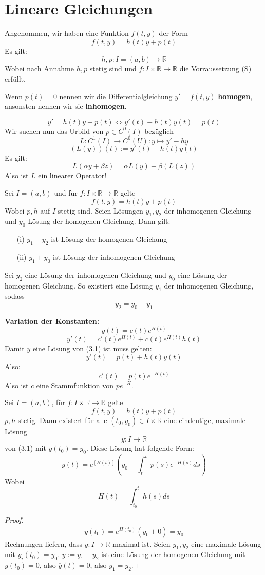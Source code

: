 \documentclass{report}
\newcommand*{\newpar}{\par\vspace{\baselineskip}\noindent}
\newcommand{\bR}{\mathbb{R}}
\begin{document}
\section{Lineare Gleichungen}
Angenommen, wir haben eine Funktion $f(t, y)$ der Form
\[f(t,y) = h(t)y + p(t)\]
Es gilt:
\[h, p : I = (a,b) \to \bR\]
Wobei nach Annahme $h, p$ stetig sind und $f : I \times \bR \to \bR$ die Vorraussetzung (S) erfüllt.
\newpar
Wenn $p(t) = 0$ nennen wir die Differentialgleichung $y' = f(t,y)$ \textbf{homogen}, ansonsten nennen wir sie \textbf{inhomogen}.
\newpar
\[y' = h(t)y + p(t) \Leftrightarrow y'(t) - h(t)y(t) = p(t)\]
Wir suchen nun das Urbild von $p \in C^0(I)$ bezüglich
\[L : C^1(I) \to C^0(U) : y \mapsto y' - hy\]
\[(L(y))(t) := y'(t) - h(t)y(t)\]
Es gilt:
\[L(\alpha y + \beta z) = \alpha L(y) + \beta(L(z))\]
Also ist $L$ ein linearer Operator!
\newpar
[...]
\clearpage
\begin{lemma}
	Sei $I = (a,b)$ und für $f : I \times \bR \to \bR$ gelte
	\[f(t,y) = h(t)y + p(t)\]
	Wobei $p, h$ auf $I$ stetig sind. Seien Lösungen $y_1, y_2$ der inhomogenen Gleichung und $y_0$ Lösung der homogenen Gleichung. Dann gilt:
	\begin{enumerate}
		\item[(i)] $y_1 - y_2$ ist Lösung der homogenen Gleichung
		\item[(ii)] $y_1 + y_0$ ist Lösung der inhomogenen Gleichung
	\end{enumerate}
\end{lemma}
\begin{lemma}
	Sei $y_2$ eine Lösung der inhomogenen Gleichung und $y_0$ eine Lösung der homogenen Gleichung. So existiert eine Lösung $y_1$ der inhomogenen Gleichung, sodass
	\[y_2 = y_0 + y_1\]
\end{lemma}
	\textbf{Variation der Konstanten:} 
	\[y(t) = c(t) e^{H(t)}\]
	\[y'(t) = c'(t) e^{H(t)} + c(t)e^{H(t)}h(t)\]
	Damit $y$ eine Lösung von (3.1) ist muss gelten:
	\[y'(t) = p(t) + h(t)y(t)\]
	Also:
	\[c'(t) = p(t)e^{-H(t)}\]
	Also ist $c$ eine Stammfunktion von $pe^{-H}$.
\begin{theorem}
	Sei $I = (a,b)$, für $f : I \times \bR \to \bR$ gelte
	\[f(t,y) = h(t)y + p(t)\]
	$p,h$ stetig. Dann existert für alle $(t_0, y_0) \in I \times \bR$ eine eindeutige, maximale Lösung
	\[y : I \to \bR\]
	von (3.1) mit $y(t_0) = y_0$. Diese Lösung hat folgende Form:
	\[y(t) = e^{[H(t)]}\left(y_0 + \int_{t_0}^t p(s) e^{-H(s)} ds\right)\]
	Wobei
	\[H(t) = \int_{t_0}^t h(s) ds\]
\end{theorem}
\begin{proof}
	\begin{align*}
		y(t_0) = e^{H(t_0)} (y_0 + 0) = y_0
	\end{align*}
	Rechnungen liefern, dass $y : I \to \bR$ maximal ist. Seien $y_1, y_2$ eine maximale Lösung mit $y_i(t_0) = y_0$. $\overline{y} := y_1 - y_2$ ist eine Lösung der homogenen Gleichung mit $y(t_0) = 0$, also $\overline{y}(t) = 0$, also $y_1 = y_2$.
\end{proof}
%
%
%
%
%
%
%
\clearpage
\end{document}
